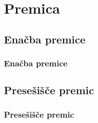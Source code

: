 \section{Premica}

\begin{frame}
    \sectionpage
\end{frame}

\begin{frame}
\end{frame}
        


    \subsection{Enačba premice}

        \begin{frame}
            \frametitle{Enačba premice}
        \end{frame}

    \subsection{Presešišče premic}

        \begin{frame}
            \frametitle{Presešišče premic}
        \end{frame}


